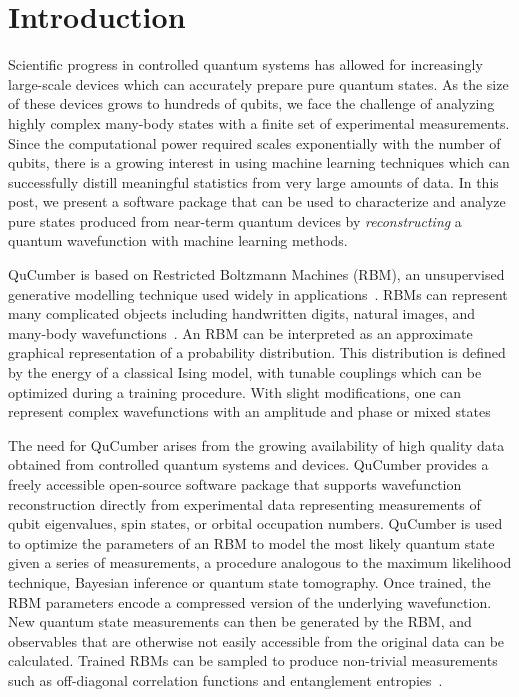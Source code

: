 \documentclass[submission, Phys]{SciPost}
\begin{document}
\section{Introduction}

Scientific progress in controlled quantum systems has allowed for increasingly large-scale devices which can accurately prepare pure quantum states.
As the size of these devices grows to hundreds of qubits, we face the challenge of analyzing highly complex many-body states with a finite set of experimental measurements.
Since the computational power required scales exponentially with the number of qubits, there is a growing interest in using machine learning techniques which can successfully distill meaningful statistics from very large amounts of data.
In this post, we present a software package that can be used to characterize and analyze pure states produced from near-term 
quantum devices by {\it reconstructing} a quantum wavefunction with machine learning methods.

QuCumber is based on Restricted Boltzmann Machines (RBM), an unsupervised generative modelling technique 
used widely in applications~\cite{Smolensky}.
RBMs can represent many complicated objects including handwritten digits, natural images, and many-body wavefunctions~\cite{Torlai2016thermo, CarleoTroyer2017Science, ChenWang2018, GlasserCirac2018}.
An RBM can be interpreted as an approximate graphical representation of a probability distribution. This distribution is defined by the energy of a classical Ising model, with tunable couplings which can be optimized during a training procedure.
With slight modifications, one can represent complex wavefunctions with an amplitude and phase or mixed states~\cite{torlai2018tomography, TorlaiPure} 

The need for QuCumber arises from the growing availability of high quality data obtained from controlled quantum
systems and devices.
QuCumber provides a freely accessible open-source software package that supports wavefunction reconstruction directly from experimental data representing measurements of qubit eigenvalues, spin states, or orbital occupation numbers.
QuCumber is used to optimize the parameters of an RBM to model the most likely quantum state given a series of measurements,
a procedure analogous to the maximum likelihood technique, Bayesian inference or quantum state tomography. 
Once trained, the RBM parameters encode a compressed version of the underlying wavefunction.
New quantum state measurements can then be generated by the RBM, and observables that are otherwise not easily accessible from the original data can be calculated. 
Trained RBMs can be sampled to produce non-trivial measurements such as off-diagonal correlation functions and entanglement entropies~\cite{Torlai2016thermo, torlai2018tomography}.
\end{document}
